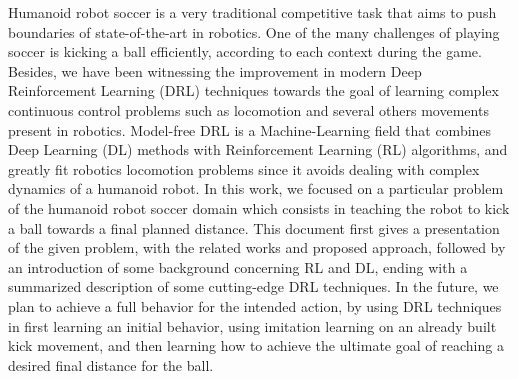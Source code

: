 
Humanoid robot soccer is a very traditional competitive task that aims to push boundaries of state-of-the-art in robotics. One of the many challenges of playing soccer is kicking a ball efficiently, according to each context during the game. Besides, we have been witnessing the improvement in modern Deep Reinforcement Learning (DRL) techniques towards the goal of learning complex continuous control problems such as locomotion and several others movements present in robotics. Model-free DRL is a Machine-Learning field that combines Deep Learning (DL) methods with Reinforcement Learning (RL) algorithms, and greatly fit robotics locomotion problems since it avoids dealing with complex dynamics of a humanoid robot. In this work, we focused on a particular problem of the humanoid robot soccer domain which consists in teaching the robot to kick a ball towards a final planned distance. This document first gives a presentation of the given problem, with the related works and proposed approach, followed by an introduction of some background concerning RL and DL, ending with a summarized description of some cutting-edge DRL techniques. In the future, we plan to achieve a full behavior for the intended action, by using DRL techniques in first learning an initial behavior, using imitation learning on an already built kick movement, and then learning how to achieve the ultimate goal of reaching a desired final distance for the ball.